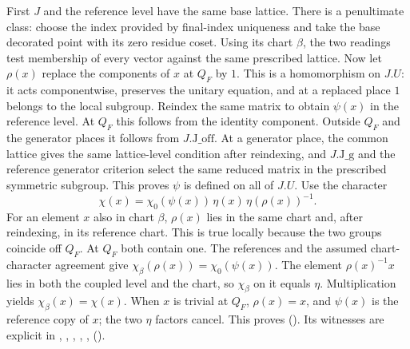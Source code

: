First $J$ and the reference level have the same base lattice. There
is a penultimate class: choose the index provided by final-index
uniqueness and take the base decorated point with its zero residue coset.
Using its chart $\beta$, the two readings test membership of every vector
against the same prescribed lattice. Now let $\rho(x)$ replace the
components of $x$ at $Q_F$ by $1$. This is a homomorphism on $J.U$:
it acts componentwise, preserves the unitary equation, and at a replaced
place $1$ belongs to the local subgroup. Reindex the same matrix to obtain
$\psi(x)$ in the reference level. At $Q_F$ this follows from the identity
component. Outside $Q_F$ and the generator places it follows from
$J.\mathrm{J\_off}$. At a generator place, the common lattice gives the
same lattice-level condition after reindexing, and $J.\mathrm{J\_g}$ and
the reference generator criterion select the same reduced matrix in the
prescribed symmetric subgroup. This proves $\psi$ is defined on all of
$J.U$. Use the character
\[
 \chi(x)=\chi_0(\psi(x))\,\eta(x)\,\eta(\rho(x))^{-1}.
\]
For an element $x$ also in chart $\beta$, $\rho(x)$ lies in the same
chart and, after reindexing, in its reference chart. This is true locally
because the two groups coincide off $Q_F$. At $Q_F$ both contain one.
The references and the assumed chart-character agreement give
$\chi_\beta(\rho(x))=\chi_0(\psi(x))$. The element $\rho(x)^{-1}x$
lies in both the coupled level and the chart, so $\chi_\beta$ on it
equals $\eta$. Multiplication yields $\chi_\beta(x)=\chi(x)$.
When $x$ is trivial at $Q_F$, $\rho(x)=x$, and $\psi(x)$ is the
reference copy of $x$; the two $\eta$ factors cancel. This proves
().
Its witnesses are explicit in , ,
, ,
, 
().

